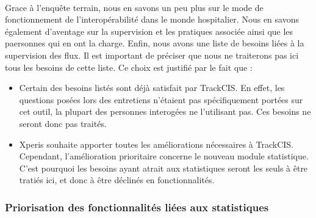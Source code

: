 			\paragraph{}%
			Grace à l'enquête terrain, nous en savons un peu plus sur le mode de
			fonctionnement de l'interopérabilité dans le monde hospitalier. Nous en
			savons également d'aventage sur la supervision et les pratiques associée
			ainsi que les paersonnes qui en ont la charge. Enfin, nous avons une liste de
			besoins liées à la supervision des flux. Il est important de préciser que
			nous ne traiterons pas ici tous les besoins de cette liste. Ce choix est
			justifié par le fait que :
			\begin{itemize}
			  \item Certain des besoins listés sont déjà satisfait par TrackCIS. En
			  effet, les questions posées lors des entretiens n'étaient pas
			  spécifiquement portées sur cet outil, la plupart des personnes interogées
			  ne l'utilisant pas. Ces besoins ne seront donc pas traités.
			  \item Xperis souhaite apporter toutes les améliorations nécessaires à
			  TrackCIS. Cependant, l'amélioration prioritaire concerne le nouveau module
			  statistique. C'est pourquoi les besoins ayant atrait aux statistiques
			  seront les seuls à être tratiés ici, et donc à être déclinés en
			  fonctionnalités.
			\end{itemize}
			
		\subsubsection{Priorisation des fonctionnalités liées aux statistiques}
			\paragraph{}%
			
